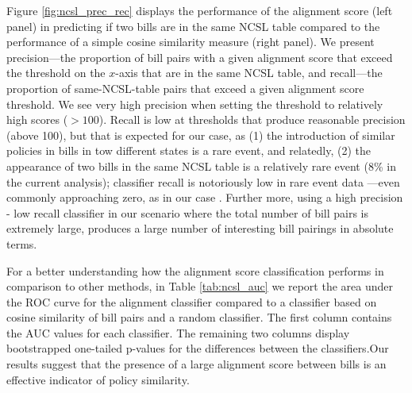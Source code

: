 \documentclass[12pt]{article} %
\begin{document}
Figure \ref{fig:ncsl_prec_rec} displays the performance of the alignment score (left panel)
in predicting if two bills are in the same NCSL table compared to the performance of a simple cosine similarity measure (right panel). We present
precision---the proportion of bill pairs with a given alignment score that
exceed the threshold on the $x$-axis that are in the same NCSL table, and
recall---the proportion of same-NCSL-table pairs that exceed a given alignment
score threshold. We see very high precision when setting the threshold to
relatively high scores ($>100$). Recall is low at thresholds that produce
reasonable precision (above 100), but that is expected for our case, as
(1) the introduction of similar policies in bills in tow different states is a
rare event, and relatedly, (2) the appearance of two bills in the same NCSL
table is a relatively rare event (8\% in the current analysis); classifier
recall is notoriously low in rare event data \citep{weiss2000learning}---even
commonly approaching zero, as in our case \citep{weiss2004mining}. Further more,
using a high precision - low recall classifier in our scenario where the total
number of bill pairs is extremely large, produces a large number of interesting
bill pairings in absolute terms. 



For a better understanding how the alignment score classification performs in
comparison to other methods, in Table \ref{tab:ncsl_auc} we report the area under the ROC curve for the
alignment classifier compared to a classifier based on cosine similarity of bill
pairs and a random classifier. The first column contains the AUC values for each
classifier. The remaining two columns display bootstrapped one-tailed p-values for the
differences between the classifiers.Our results suggest that the presence of a large alignment score between bills is an effective indicator of policy similarity. 

\end{document}
